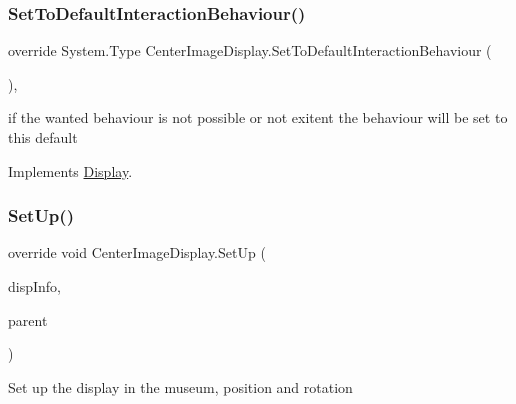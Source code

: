 \mbox{\label{class_center_image_display_ac6ddf9c8df99ff76c0f508ba4e45a217}} 
\subsubsection{\texorpdfstring{Set\+To\+Default\+Interaction\+Behaviour()}{SetToDefaultInteractionBehaviour()}}
{\footnotesize\ttfamily override System.\+Type Center\+Image\+Display.\+Set\+To\+Default\+Interaction\+Behaviour (\begin{DoxyParamCaption}{ }\end{DoxyParamCaption})\hspace{0.3cm}{\ttfamily [protected]}, {\ttfamily [virtual]}}



if the wanted behaviour is not possible or not exitent the behaviour will be set to this default 



Implements \mbox{\hyperlink{class_display_a81f07350cf50b3924f4fe269e1b4cf17}{Display}}.

\mbox{\label{class_center_image_display_a3da996020c7d8abcd24f35660945703a}} 
\subsubsection{\texorpdfstring{Set\+Up()}{SetUp()}}
{\footnotesize\ttfamily override void Center\+Image\+Display.\+Set\+Up (\begin{DoxyParamCaption}\item[{\mbox{\hyperlink{class_museum_display_info}{Museum\+Display\+Info}}}]{disp\+Info,  }\item[{Game\+Object}]{parent }\end{DoxyParamCaption})\hspace{0.3cm}{\ttfamily [virtual]}}



Set up the display in the museum, position and rotation 



